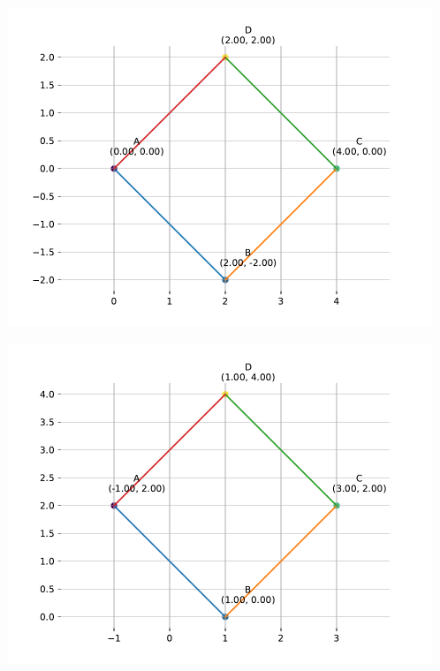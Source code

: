 \begin{figure}[H]
	\begin{center} 
	    \includegraphics[width=0.75\columnwidth]{chapters/10/7/4/4/figs/fig1.pdf}
	\end{center}
\caption{}
\label{fig:7/4/4/4Fig2}
\end{figure}
\begin{figure}[H]
	\begin{center} 
	    \includegraphics[width=0.75\columnwidth]{chapters/10/7/4/4/figs/fig2.pdf}
	\end{center}
\caption{}
\label{fig:7/4/4/4Fig1}
\end{figure}
